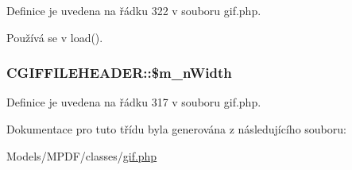 Definice je uvedena na řádku 322 v souboru gif.\-php.



Používá se v load().

\hypertarget{class_c_g_i_f_f_i_l_e_h_e_a_d_e_r_a45a9480bb362700a57ea75dd1edfcd3f}{
\subsubsection[{\$m\-\_\-n\-Width}]{\setlength{\rightskip}{0pt plus 5cm}C\-G\-I\-F\-F\-I\-L\-E\-H\-E\-A\-D\-E\-R\-::\$m\-\_\-n\-Width}}\label{class_c_g_i_f_f_i_l_e_h_e_a_d_e_r_a45a9480bb362700a57ea75dd1edfcd3f}


Definice je uvedena na řádku 317 v souboru gif.\-php.



Dokumentace pro tuto třídu byla generována z následujícího souboru\-:\begin{DoxyCompactItemize}
\item 
Models/\-M\-P\-D\-F/classes/\hyperlink{gif_8php}{gif.\-php}\end{DoxyCompactItemize}
